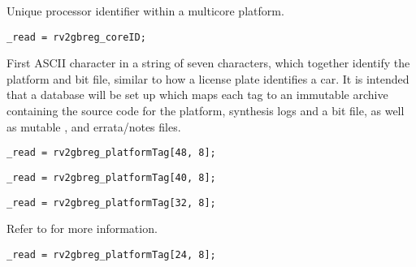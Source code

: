 Unique processor identifier within a multicore platform.

\reset{********}
\implementation{}
\begin{lstlisting}
_read = rv2gbreg_coreID;
\end{lstlisting}

First ASCII character in a string of seven characters, which together identify 
the platform and bit file, similar to how a license plate identifies a car. It 
is intended that a database will be set up which maps each tag to an immutable 
archive containing the source code for the platform, synthesis logs and a bit 
file, as well as mutable ,  and errata/notes 
files.

\implementation{}
\begin{lstlisting}
_read = rv2gbreg_platformTag[48, 8];
\end{lstlisting}

\implementation{}
\begin{lstlisting}
_read = rv2gbreg_platformTag[40, 8];
\end{lstlisting}

\implementation{}
\begin{lstlisting}
_read = rv2gbreg_platformTag[32, 8];
\end{lstlisting}


Refer to  for more information.

\implementation{}
\begin{lstlisting}
_read = rv2gbreg_platformTag[24, 8];
\end{lstlisting}

